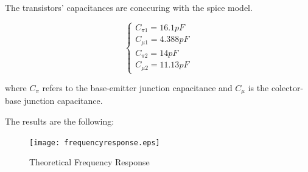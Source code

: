 The transistors' capacitances are conccuring with the spice model.

\begin{equation}
 \begin{cases}
  C_{\pi 1}=16.1pF\\
  C_{\mu 1}=4.388pF\\
  C_{\pi 2}=14pF\\
  C_{\mu 2}=11.13pF
 \end{cases}
\end{equation}

where $C_{\pi}$ refers to the base-emitter junction capacitance and $C_{\mu}$ is the colector-base junction capacitance.

The results are the following:

 \begin{figure}[h] \centering
\texttt{[image: frequencyresponse.eps]}
\vspace{-5mm}
\caption{Theoretical Frequency Response}\label{fig:rc}
\end{figure}


\newpage
